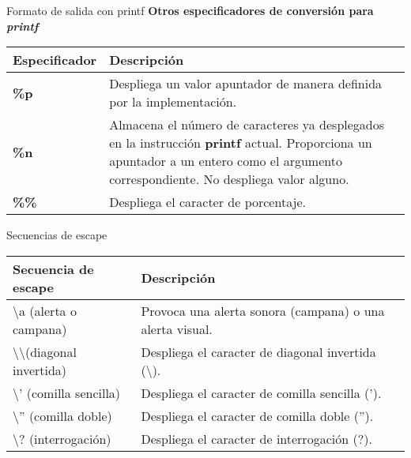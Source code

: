 \begin{frame}[t]{Formato de salida con printf}
\textbf{Otros especificadores de conversi\'on para \textit{printf}}\\ \vspace{5mm}
\scriptsize
\begin{center}
\begin{tabular}{lp{7.5cm}}
	\toprule
	\textbf{Especificador} & \textbf{Descripción}\\
	\midrule
	\textbf{\%p} & Despliega un valor apuntador de manera definida por la implementación.\\ 
	\textbf{\%n} & Almacena el número de caracteres ya desplegados en la instrucci\'on \textbf{printf} actual. Proporciona un apuntador a un entero como el argumento correspondiente. No despliega valor alguno.\\ 
	\textbf{\%\%} & Despliega el caracter de porcentaje.\\
	\bottomrule
\end{tabular}
\end{center}
\end{frame}

\begin{frame}[t]{Secuencias de escape}
\small
\begin{center}
\begin{tabular}{lp{6cm}}
	\toprule
	\textbf{Secuencia de escape} & \textbf{Descripción}\\
	\midrule
	\textbackslash a (alerta o campana) & Provoca una alerta sonora (campana) o una alerta visual.\\
	\textbackslash \textbackslash (diagonal invertida) & Despliega el caracter de diagonal invertida (\textbackslash).\\
	\textbackslash ' (comilla sencilla) & Despliega el caracter de comilla sencilla (').\\
	\textbackslash '' (comilla doble) & Despliega el caracter de comilla doble (''). \\ 
	\textbackslash ? (interrogación) & Despliega el caracter de interrogación (?).\\
	\bottomrule
\end{tabular}
\end{center}
\end{frame}

